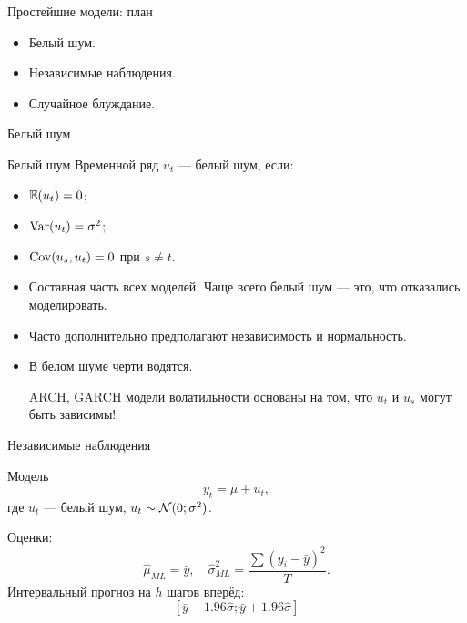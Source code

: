 
\begin{frame} %


\end{frame}



\begin{frame}{Простейшие модели: план}
  \begin{itemize}[<+->]
    \item Белый шум. 
    \item Независимые наблюдения.
    \item Случайное блуждание.
  \end{itemize}

\end{frame}

\begin{frame}{Белый шум}

\begin{block}{Белый шум}
Временной ряд $u_t$ — белый шум, если:
\begin{itemize}
  \item $\mathbb{E}(u_t) = 0$;
  \item $\operatorname{Var}(u_t) = \sigma^2$;
  \item $\operatorname{Cov}(u_s, u_t) = 0$ при $s\neq t$.
\end{itemize}
\end{block}

\pause
\begin{itemize}[<+->]
  \item Составная часть всех моделей. Чаще всего белый шум — это, что отказались моделировать. 
  \item Часто дополнительно предполагают \alert{независимость} и \alert{нормальность}. 
  \item В белом шуме \alert{черти водятся}.
  
  ARCH, GARCH модели волатильности основаны на том, что $u_t$ и $u_s$ могут быть зависимы!
\end{itemize}

\end{frame}


\begin{frame}{Независимые наблюдения}

  \begin{block}{Модель}
  \[
  y_t = \mu + u_t,  
  \]
  где $u_t$ — белый шум, $u_t \sim \mathcal{N}(0;\sigma^2)$.
  \end{block}
  \pause
  \alert{Оценки:}
  \[
  \hat \mu_{ML} = \bar y, \quad \hat\sigma^2_{ML} = \frac{\sum(y_i - \bar y)^2}{T}.  
  \]
  \pause
  \alert{Интервальный прогноз} на $h$ шагов вперёд:
  \[
  [\bar y - 1.96 \hat\sigma; \bar y + 1.96 \hat \sigma]  
  \]
\end{frame}
  

